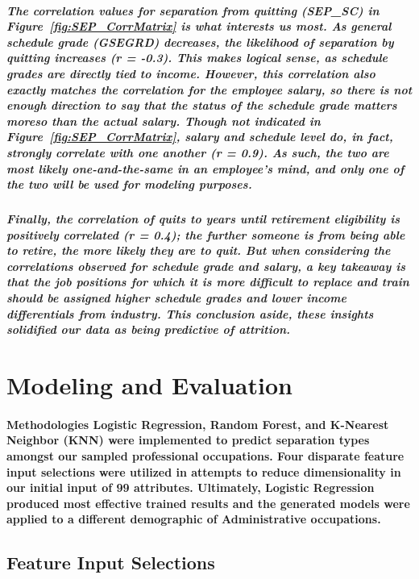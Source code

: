 \documentclass[10pt]{article}
\begin{document}
\subparagraph{The correlation values for separation from quitting (SEP\_SC) in Figure~\ref{fig:SEP_CorrMatrix} is what interests us most.  As general schedule grade (GSEGRD) decreases, the likelihood of separation by quitting increases (r = -0.3). This makes logical sense, as schedule grades are directly tied to income.  However, this correlation also exactly matches the correlation for the employee salary, so there is not enough direction to say that the status of the schedule grade matters moreso than the actual salary. Though not indicated in Figure~\ref{fig:SEP_CorrMatrix}, salary and schedule level do, in fact, strongly correlate with one another (r = 0.9). As such, the two are most likely one-and-the-same in an employee's mind, and only one of the two will be used for modeling purposes.}
 
\subparagraph{Finally, the correlation of quits to years until retirement eligibility is positively correlated (r = 0.4); the further someone is from being able to retire, the more likely they are to quit. But when considering the correlations observed for schedule grade and salary, a key takeaway is that the job positions for which it is more difficult to replace and train should be assigned higher schedule grades and lower income differentials from industry. This conclusion aside, these insights solidified our data as being predictive of attrition.}

\section{Modeling and Evaluation}

\paragraph{Methodologies Logistic Regression, Random Forest, and K-Nearest Neighbor (KNN) were implemented to predict separation types amongst our sampled professional occupations. Four disparate feature input selections were utilized in attempts to reduce dimensionality in our initial input of 99 attributes. Ultimately, Logistic Regression produced most effective trained results and the generated models were applied to a different demographic of Administrative occupations.}
 
\subsection{Feature Input Selections}
\end{document}
